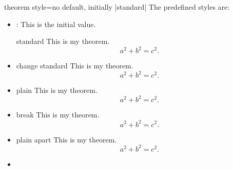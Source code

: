 \begin{docTcbKey}{theorem style}{=}{no default, initially |standard|}
The predefined styles are:
\begin{itemize}
%
\item{}: This is the initial value.
\begin{dispExample}
\begin{theorem}[theorem style=standard]{standard}{}
This is my theorem. \begin{equation*} a^2 + b^2 = c^2. \end{equation*}
\end{theorem}
\end{dispExample}
%
\item{}
\begin{dispExample}
\begin{theorem}[theorem style=change standard]{change standard}{}
This is my theorem. \begin{equation*} a^2 + b^2 = c^2. \end{equation*}
\end{theorem}
\end{dispExample}
%
\item{}
\begin{dispExample}
\begin{theorem}[theorem style=plain]{plain}{}
This is my theorem. \begin{equation*} a^2 + b^2 = c^2. \end{equation*}
\end{theorem}
\end{dispExample}
%
\clearpage
\item{}
\begin{dispExample}
\begin{theorem}[theorem style=break]{break}{}
This is my theorem. \begin{equation*} a^2 + b^2 = c^2. \end{equation*}
\end{theorem}
\end{dispExample}
%
\item{}
\begin{dispExample}
\begin{theorem}[theorem style=plain apart]{plain apart}{}
This is my theorem. \begin{equation*} a^2 + b^2 = c^2. \end{equation*}
\end{theorem}
\end{dispExample}
%
\item{}

\end{itemize}
\end{docTcbKey}

